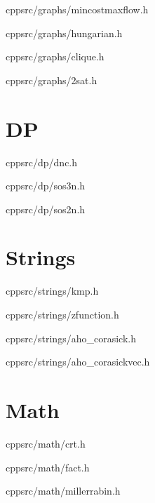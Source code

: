 \documentclass[portrait, 8pt, a4paper, oneside, twocolumn]{extarticle}
\begin{document}
    {}
    {}
    {cpp}{src/graphs/mincostmaxflow.h}
    \noindent\hrulefill

    {}
    {}
    {cpp}{src/graphs/hungarian.h}
    \noindent\hrulefill

    {}
    {}
    {cpp}{src/graphs/clique.h}
    \noindent\hrulefill

    {}
    {}
    {cpp}{src/graphs/2sat.h}
    \noindent\hrulefill

\section{DP}
    {}
    {}
    {cpp}{src/dp/dnc.h}
    \noindent\hrulefill
	
	{}
	{}
	{cpp}{src/dp/sos3n.h}
	\noindent\hrulefill

	{}
	{}
	{cpp}{src/dp/sos2n.h}
	\noindent\hrulefill

\section{Strings}
	
    {}
    {}
    {cpp}{src/strings/kmp.h}
    \noindent\hrulefill

    {}
    {}
    {cpp}{src/strings/zfunction.h}
    \noindent\hrulefill

    {}
    {}
    {cpp}{src/strings/aho_corasick.h}
    \noindent\hrulefill

    {}
    {}
    {cpp}{src/strings/aho_corasickvec.h}
    \noindent\hrulefill

    
\section{Math}

    {}
    {}
    {cpp}{src/math/crt.h}
    \noindent\hrulefill

    {}
    {}
    {cpp}{src/math/fact.h}
    \noindent\hrulefill


    {}
    {}
    {cpp}{src/math/millerrabin.h}
    \noindent\hrulefill
\end{document}
